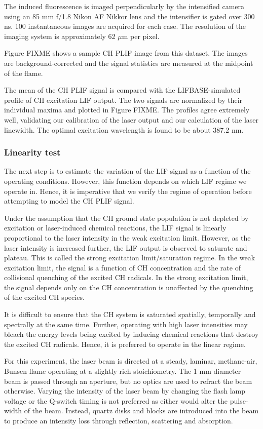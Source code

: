 The induced fluorescence is imaged perpendicularly by the intensified camera using an 85 mm f/1.8 Nikon AF Nikkor lens and the intensifier is gated over 300 ns.
100 instantaneous images are acquired for each case.
The resolution of the imaging system is approximately 62 \(\mu\)m per pixel.

Figure FIXME shows a sample CH PLIF image from this dataset.
The images are background-corrected and the signal statistics are measured at the midpoint of the flame.

The mean of the CH PLIF signal is compared with the LIFBASE-simulated profile of CH excitation LIF output.
The two signals are normalized by their individual maxima and plotted in Figure FIXME.
The profiles agree extremely well, validating our calibration of the laser output and our calculation of the laser linewidth.
The optimal excitation wavelength is found to be about 387.2 nm.

\subsubsection{Linearity test}

The next step is to estimate the variation of the LIF signal as a function of the operating conditions.
However, this function depends on which LIF regime we operate in.
Hence, it is imperative that we verify the regime of operation before attempting to model the CH PLIF signal.

Under the assumption that the CH ground state population is not depleted by excitation or laser-induced chemical reactions, the LIF signal is linearly proportional to the laser intensity in the weak excitation limit.
However, as the laser intensity is increased further, the LIF output is observed to saturate and plateau.
This is called the strong excitation limit/saturation regime.
In the weak excitation limit, the signal is a function of CH concentration and the rate of collisional quenching of the excited CH radicals.
In the strong excitation limit, the signal depends only on the CH concentration is unaffected by the quenching of the excited CH species.

It is difficult to ensure that the CH system is saturated spatially, temporally and spectrally at the same time.
Further, operating with high laser intensities may bleach the energy levels being excited by inducing chemical reactions that destroy the excited CH radicals.
Hence, it is preferred to operate in the linear regime.

For this experiment, the laser beam is directed at a steady, laminar, methane-air, Bunsen flame operating at a slightly rich stoichiometry.
The 1 mm diameter beam is passed through an aperture, but no optics are used to refract the beam otherwise.
Varying the intensity of the laser beam by changing the flash lamp voltage or the Q-switch timing is not preferred as either would alter the pulse-width of the beam.
Instead, quartz disks and blocks are introduced into the beam to produce an intensity loss through reflection, scattering and absorption.


